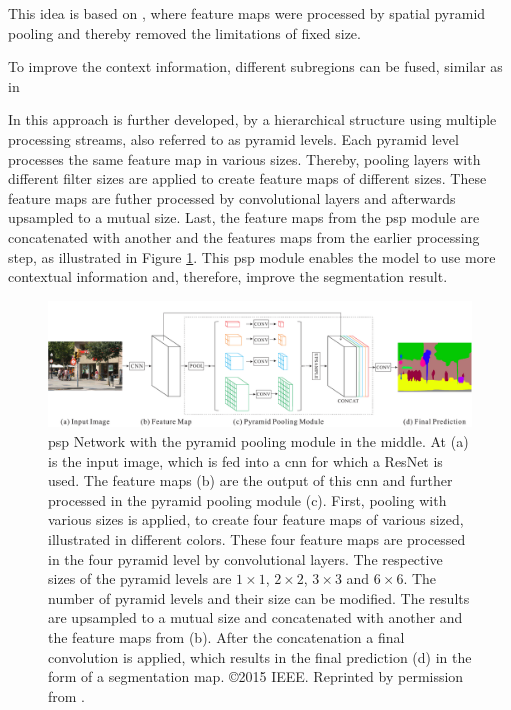 This idea is based on \cite{He15-SPP}, where feature maps were processed by spatial pyramid pooling and thereby removed the limitations of fixed size.

To improve the context information, different subregions can be fused, similar as in 

In \cite{Zhao17-PSP} this approach is further developed, by a hierarchical structure using multiple processing streams, also referred to as pyramid levels.
Each pyramid level processes the same feature map in various sizes.
Thereby, pooling layers with different filter sizes are applied to create feature maps of different sizes.
These feature maps are futher processed by convolutional layers and afterwards upsampled to a mutual size.
Last, the feature maps from the \gls{psp} module are concatenated with another and the features maps from the earlier processing step, as illustrated in Figure \ref{fig:ch2:sec2:psp}.
This \gls{psp} module enables the model to use more contextual information and, therefore, improve the segmentation result.
\begin{figure}
	\includegraphics[width=\linewidth]{figures/chap223_psp.png}
	\caption[Pyramid Scene Parsing Network]{
		\gls{psp} Network with the pyramid pooling module in the middle.
		At (a) is the input image, which is fed into a \gls{cnn} for which a ResNet is used. 
		The feature maps (b) are the output of this \gls{cnn} and further processed in the pyramid pooling module (c).
		First, pooling with various sizes is applied, to create four feature maps of various sized, illustrated in different colors.
		These four feature maps are processed in the four pyramid level by convolutional layers.
		The respective sizes of the pyramid levels are $1 \times 1$, $2 \times 2$, $3 \times 3$ and  $6 \times 6$.
		The number of pyramid levels and their size can be modified.
		The results are upsampled to a mutual size and concatenated with another and the feature maps from (b).
		After the concatenation a final convolution is applied, which results in the final prediction (d) in the form of a segmentation map.
		\copyright 2015 IEEE. Reprinted by permission from \cite{Zhao17-PSP}.}
	\label{fig:ch2:sec2:psp}
\end{figure}



